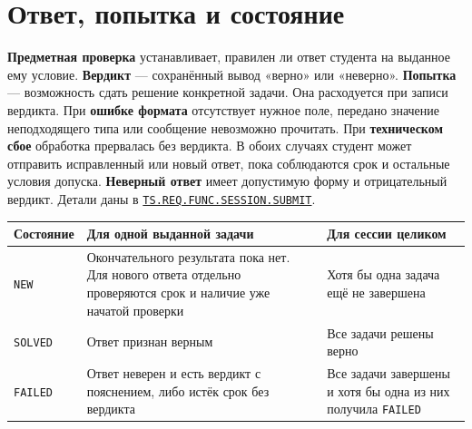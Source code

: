 \documentclass[12pt,a4paper]{article}
\begin{document}
\section{Ответ, попытка и состояние}\label{ux43eux442ux432ux435ux442-ux43fux43eux43fux44bux442ux43aux430-ux438-ux441ux43eux441ux442ux43eux44fux43dux438ux435}

\hypertarget{ответ-попытка-и-состояние}{}

\textbf{Предметная проверка} устанавливает, правилен ли ответ студента на выданное ему условие. \textbf{Вердикт} --- сохранённый вывод «верно» или «неверно». \textbf{Попытка} --- возможность сдать решение конкретной задачи. Она расходуется при записи вердикта. При \textbf{ошибке формата} отсутствует нужное поле, передано значение неподходящего типа или сообщение невозможно прочитать. При \textbf{техническом сбое} обработка прервалась без вердикта. В обоих случаях студент может отправить исправленный или новый ответ, пока соблюдаются срок и остальные условия допуска. \textbf{Неверный ответ} имеет допустимую форму и отрицательный вердикт. Детали даны в {\href{../../02\_Техническое\_задание/Техническое\_задание.pdf\#ts-req-func-session-submit}{\texttt{TS.\allowbreak{}REQ.\allowbreak{}FUNC.\allowbreak{}SESSION.\allowbreak{}SUBMIT}}}.

{\def\LTcaptype{none} %
\begin{longtable}[]{@{}
  >{\raggedright\arraybackslash}p{}
  >{\raggedright\arraybackslash}p{}
  >{\raggedright\arraybackslash}p{}@{}}
\toprule\noalign{}
\begin{minipage}[b]{\linewidth}\raggedright
Состояние
\end{minipage} & \begin{minipage}[b]{\linewidth}\raggedright
Для одной выданной задачи
\end{minipage} & \begin{minipage}[b]{\linewidth}\raggedright
Для сессии целиком
\end{minipage} \\
\midrule\noalign{}
\endhead
\bottomrule\noalign{}
\endlastfoot
\texttt{NEW} & Окончательного результата пока нет. Для нового ответа отдельно проверяются срок и наличие уже начатой проверки & Хотя бы одна задача ещё не завершена \\
\texttt{SOLVED} & Ответ признан верным & Все задачи решены верно \\
\texttt{FAILED} & Ответ неверен и есть вердикт с пояснением, либо истёк срок без вердикта & Все задачи завершены и хотя бы одна из них получила \texttt{FAILED} \\
\end{longtable}
}
\end{document}
